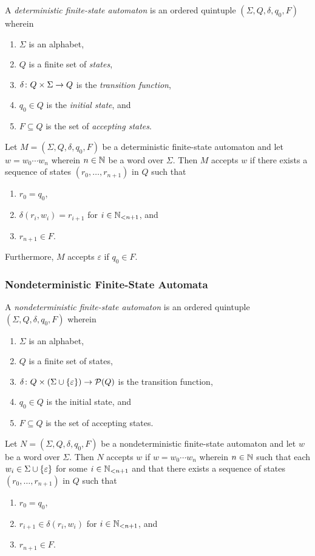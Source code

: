 \Bdf
  A \emph{deterministic finite-state automaton} is an ordered quintuple \((\Sigma, Q, \delta, q_0, F)\) wherein
  \begin{enumerate}
    \item \(\Sigma\) is an alphabet,
    \item \(Q\) is a finite set of \emph{states},
    \item \(\map{\delta}{Q \times \Sigma}{Q}\) is the \emph{transition function},
    \item \(q_0 \in Q\) is the \emph{initial state}, and
    \item \(F \subseteq Q\) is the set of \emph{accepting states}.
  \end{enumerate}
\Edf

Let \(M = (\Sigma, Q, \delta, q_0, F)\) be a deterministic finite-state automaton and let \(w = w_0 \cdots w_n\) wherein
\(n \in \setnat\) be a word over \(\Sigma\).  Then \(M\) accepts \(w\) if there exists a sequence of states \((r_0,
\ldots, r_{n + 1})\) in \(Q\) such that
\begin{enumerate}
  \item \(r_0 = q_0\),
  \item \(\delta(r_i, w_i) = r_{i + 1}\) for \(i \in \Nln[n + 1]\), and
  \item \(r_{n + 1} \in F\).
\end{enumerate}
Furthermore, \(M\) accepts \(\varepsilon\) if \(q_0 \in F\).

\subsubsection{Nondeterministic Finite-State Automata}

\Bdf
  A \emph{nondeterministic finite-state automaton} is an ordered quintuple \((\Sigma, Q, \delta, q_0, F)\) wherein
  \begin{enumerate}
    \item \(\Sigma\) is an alphabet,
    \item \(Q\) is a finite set of states,
    \item \(\map{\delta}{Q \times (\Sigma \cup \set{\varepsilon})}{\pow(Q)}\) is the transition function,
    \item \(q_0 \in Q\) is the initial state, and
    \item \(F \subseteq Q\) is the set of accepting states.
  \end{enumerate}
\Edf

Let \(N = (\Sigma, Q, \delta, q_0, F)\) be a nondeterministic finite-state automaton and let \(w\) be a word over
\(\Sigma\). Then \(N\) accepts \(w\) if \(w = w_0 \cdots w_n\) wherein \(n \in \setnat\) such that each
\(w_i \in \Sigma \cup \set{\varepsilon}\) for some \(i \in \Nln[n + 1]\) and that there exists a sequence of states
\((r_0, \ldots, r_{n + 1})\) in \(Q\) such that
\begin{enumerate}
  \item \(r_0 = q_0\),
  \item \(r_{i + 1} \in \delta(r_i, w_i)\) for \(i \in \Nln[n + 1]\), and
  \item \(r_{n + 1} \in F\).
\end{enumerate}


